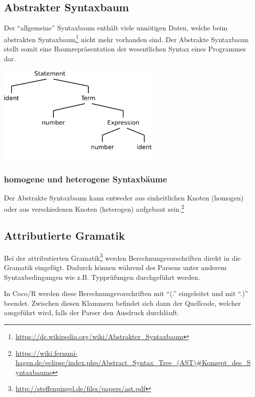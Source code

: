 \subsection{Abstrakter Syntaxbaum}

Der ``allgemeine'' Syntaxbaum enth\"alt viele unn\"otigen Daten, welche beim abstrakten Syntaxbaum\footnote{\url{https://de.wikipedia.org/wiki/Abstrakter_Syntaxbaum}} nicht mehr vorhanden sind. Der Abstrakte Syntaxbaum stellt somit eine Baumrepr\"asentation der wesentlichen Syntax eines Programmes dar.

\includegraphics[width=0.6\textwidth]{./media/images/compiler/abstract_syntaxtree.png}

\subsubsection{homogene und heterogene Syntaxbäume}

Der Abstrakte Syntaxbaum kann entweder aus einheitlichen Knoten (homogen) oder aus verschiedenen Knoten (heterogen) aufgebaut sein.\footnote{\url{https://wiki.fernuni-hagen.de/eclipse/index.php/Abstract_Syntax_Tree_(AST)\#Konzept_des_Syntaxbaums}}

\subsection{Attributierte Gramatik}

Bei der attributierten Gramatik\footnote{\url{http://steffenpingel.de/files/papers/ast.pdf}} werden Berechnungsvorschriften direkt in die Gramatik eingef\"ugt. Dadurch k\"onnen w\"ahrend des Parsens unter anderem Syntaxbedingungen wie z.B. Typpr\"ufungen durchgef\"uhrt werden.

In Coco/R werden diese Berechnungsvorschriften mit ``(.'' eingeleitet und mit ``.)'' beendet. Zwischen diesen Klammern befindet sich dann der Quellcode, welcher ausgef\"uhrt wird, falls der Parser den Ausdruck durchl\"auft.

